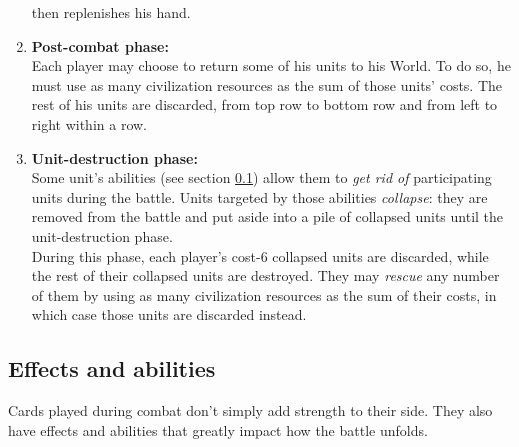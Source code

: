 \documentclass[a4paper]{article}
\begin{document}
\begin{enumerate}
                then replenishes his hand.
                \label{battle7}
            \item \textbf{Post-combat phase:}\\
                Each player may choose to return some of his units to his World.
                To do so, he must use as many civilization resources
                as the sum of those units' costs.
                The rest of his units are discarded,
                from top row to bottom row and from left to right within a row.
            \item \textbf{Unit-destruction phase:}\\
                Some unit's abilities (see section \ref{abilities}) allow them
                to \textit{get rid of} participating units during the battle.
                Units targeted by those abilities \textit{collapse}:
                they are removed from the battle and put aside
                into a pile of collapsed units until the unit-destruction phase.\\
                During this phase, each player's cost-6 collapsed units are discarded,
                while the rest of their collapsed units are destroyed.
                They may \textit{rescue} any number of them by using
                as many civilization resources as the sum of their costs,
                in which case those units are discarded instead.      
        \end{enumerate}

\newpage
    \subsection{Effects and abilities}
        \label{abilities}
        Cards played during combat don't simply add strength to their side.
        They also have effects and abilities that greatly impact how the battle unfolds.
\end{document}
